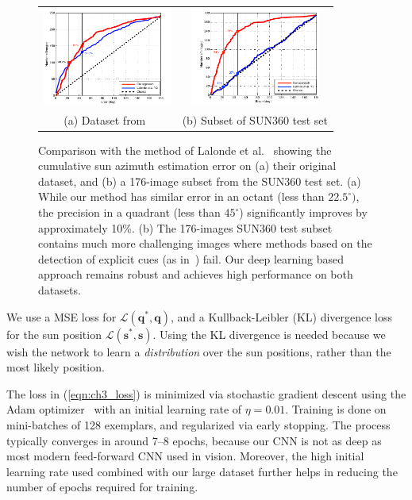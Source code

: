 \begin{figure}[!th]
    \centering
    \footnotesize
    \setlength{\tabcolsep}{1pt}
    \begin{tabular}{cc}
    \includegraphics[height=3.2cm]{figures/compare_jf12/lalonde-db-margin.pdf} & 
    \includegraphics[height=3.2cm]{figures/compare_jf12/sun360-db-margin.pdf} \\
    (a) Dataset from~\cite{lalonde-ijcv-12} &
    (b) Subset of SUN360 test set
    \end{tabular}
    \vspace{.5em} 
    \caption{Comparison with the method of Lalonde et al.~\cite{lalonde-ijcv-12} showing the cumulative sun azimuth estimation error on (a) their original dataset, and (b) a 176-image subset from the SUN360 test set. (a) While our method has similar error in an octant (less than $22.5^\circ)$, the precision in a quadrant (less than $45^\circ$) significantly improves by approximately 10\%. (b) The 176-images SUN360 test subset contains much more challenging images where methods based on the detection of explicit cues (as in~\cite{lalonde-ijcv-12}) fail. Our deep learning based approach remains robust and achieves high performance on both datasets.}
    \label{fig:comparison-lalonde12}
\end{figure}

We use a MSE loss for $\mathcal{L}(\mathbf{q}^*, \mathbf{q})$, and a Kullback-Leibler (KL) divergence loss for the sun position $\mathcal{L}(\mathbf{s}^*, \mathbf{s})$. Using the KL divergence is needed because we wish the network to learn a \emph{distribution} over the sun positions, rather than the most likely position. 

The loss in (\ref{eqn:ch3_loss}) is minimized via stochastic gradient descent using the Adam optimizer~\cite{kingma-iclr-15} with an initial learning rate of $\eta=0.01$. Training is done on mini-batches of 128 exemplars, and regularized via early stopping. The process typically converges in around 7--8 epochs, because our CNN is not as deep as most modern feed-forward CNN used in vision. Moreover, the high initial learning rate used combined with our large dataset further helps in reducing the number of epochs required for training.



